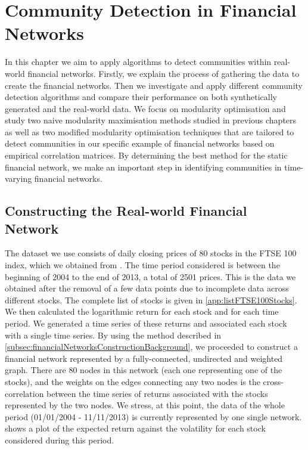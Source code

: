 
\chapter{Community Detection in Financial Networks}

\label{cha:communityDetectionFinancialNetworks}


In this chapter we aim to apply algorithms to detect communities within real-world financial networks.
Firstly, we explain the process of gathering the data to create the financial networks.
Then we investigate and apply different community detection algorithms and compare their performance on both synthetically generated and the real-world data.
We focus on modularity optimisation and study two naive modularity maximisation methods studied in previous chapters as well as two modified modularity optimisation techniques that are tailored to detect communities in our specific example of financial networks based on empirical correlation matrices.
By determining the best method for the static financial network, we make an important step in identifying communities in time-varying financial networks.


\section{Constructing the Real-world Financial Network}
\label{sec:realWorldFinancialNetwork}

The dataset we use consists of daily closing prices of 80 stocks in the FTSE 100 index, which we obtained from \cite{LSE,YahFi}.
The time period considered is between the beginning of 2004 to the end of 2013, a total of 2501 prices. 
This is the data we obtained after the removal of a few data points due to incomplete data across different stocks.
The complete list of stocks is given in \cref{app:listFTSE100Stocks}.
We then calculated the logarithmic return for each stock and for each time period.
We generated a time series of these returns and associated each stock with a single time series.
By using the method described in \cref{subsec:financialNetworksConstructionBackground}, we proceeded to construct a financial network represented by a fully-connected, undirected and weighted graph.
There are 80 nodes in this network (each one representing one of the stocks), and the weights on the edges connecting any two nodes is the cross-correlation between the time series of returns associated with the stocks represented by the two nodes.
We stress, at this point, the data of the whole period (01/01/2004 - 11/11/2013) is currently represented by one single network.
 shows a plot of the expected return against the volatility for each stock considered during this period.

